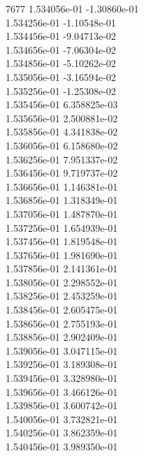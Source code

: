 7677	1.534056e-01	-1.30860e-01	\\ 	1.534256e-01	-1.10548e-01	\\ 	1.534456e-01	-9.04713e-02	\\ 	1.534656e-01	-7.06304e-02	\\ 	1.534856e-01	-5.10262e-02	\\ 	1.535056e-01	-3.16594e-02	\\ 	1.535256e-01	-1.25308e-02	\\ 	1.535456e-01	6.358825e-03	\\ 	1.535656e-01	2.500881e-02	\\ 	1.535856e-01	4.341838e-02	\\ 	1.536056e-01	6.158680e-02	\\ 	1.536256e-01	7.951337e-02	\\ 	1.536456e-01	9.719737e-02	\\ 	1.536656e-01	1.146381e-01	\\ 	1.536856e-01	1.318349e-01	\\ 	1.537056e-01	1.487870e-01	\\ 	1.537256e-01	1.654939e-01	\\ 	1.537456e-01	1.819548e-01	\\ 	1.537656e-01	1.981690e-01	\\ 	1.537856e-01	2.141361e-01	\\ 	1.538056e-01	2.298552e-01	\\ 	1.538256e-01	2.453259e-01	\\ 	1.538456e-01	2.605475e-01	\\ 	1.538656e-01	2.755193e-01	\\ 	1.538856e-01	2.902409e-01	\\ 	1.539056e-01	3.047115e-01	\\ 	1.539256e-01	3.189308e-01	\\ 	1.539456e-01	3.328980e-01	\\ 	1.539656e-01	3.466126e-01	\\ 	1.539856e-01	3.600742e-01	\\ 	1.540056e-01	3.732821e-01	\\ 	1.540256e-01	3.862359e-01	\\ 	1.540456e-01	3.989350e-01	\\ \hline
